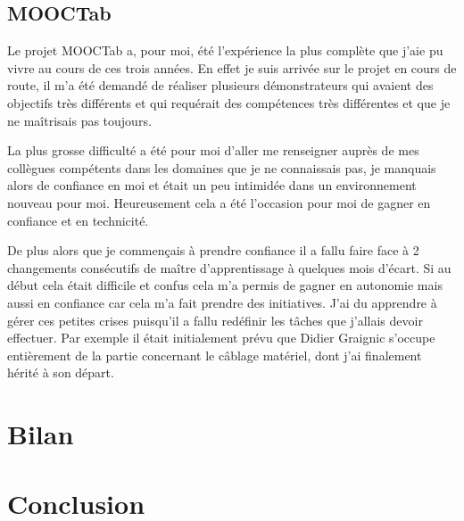\documentclass[french,12pt,a4paper,titlepage,openright,openbib]{report}
\begin{document}
\section{MOOCTab}

Le projet MOOCTab a, pour moi, été l'expérience la plus complète que j'aie pu  vivre au cours de ces trois années. En effet je suis arrivée sur le projet en cours de route, il m'a été demandé de réaliser plusieurs démonstrateurs qui avaient des objectifs très différents et qui requérait des compétences très différentes et que je ne maîtrisais pas toujours.

La plus grosse difficulté a été pour moi d'aller me renseigner auprès de mes collègues compétents dans les domaines que je ne connaissais pas, je manquais alors de confiance en moi et était un peu intimidée dans un environnement nouveau pour moi. Heureusement cela a été l'occasion pour moi de gagner en confiance et en technicité.

De plus alors que je commençais à prendre confiance il a fallu faire face à 2 changements consécutifs de maître d'apprentissage à quelques mois d'écart. Si au début cela était difficile et confus cela m'a permis de gagner en autonomie mais aussi en confiance car cela m'a fait prendre des initiatives. J'ai du apprendre à gérer ces petites crises puisqu'il a fallu redéfinir les tâches que j'allais devoir effectuer. Par exemple il était initialement prévu que Didier Graignic s'occupe entièrement de la partie concernant le câblage matériel, dont j'ai finalement hérité à son départ.

 


\chapter{Bilan}

\chapter{Conclusion}

\printglossary[title={Glossaire}]

{}

	
\end{document}
